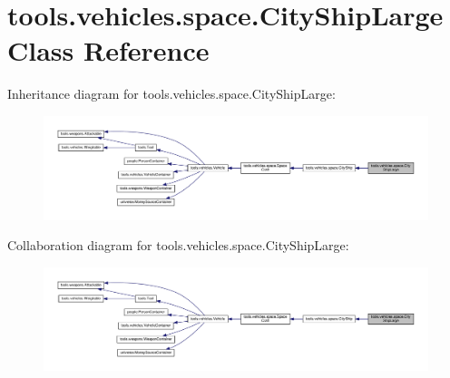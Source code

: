 \hypertarget{classtools_1_1vehicles_1_1space_1_1_city_ship_large}{}\section{tools.\+vehicles.\+space.\+City\+Ship\+Large Class Reference}
\label{classtools_1_1vehicles_1_1space_1_1_city_ship_large}


Inheritance diagram for tools.\+vehicles.\+space.\+City\+Ship\+Large\+:
\nopagebreak
\begin{figure}[H]
\begin{center}
\leavevmode
\includegraphics[width=350pt]{classtools_1_1vehicles_1_1space_1_1_city_ship_large__inherit__graph}
\end{center}
\end{figure}


Collaboration diagram for tools.\+vehicles.\+space.\+City\+Ship\+Large\+:
\nopagebreak
\begin{figure}[H]
\begin{center}
\leavevmode
\includegraphics[width=350pt]{classtools_1_1vehicles_1_1space_1_1_city_ship_large__coll__graph}
\end{center}
\end{figure}
